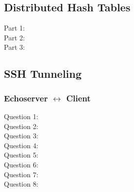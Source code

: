\subsection{Distributed Hash Tables}
\begin{description}
    \item[Part 1:] 
    \item[Part 2:] 
    \item[Part 3:] 
\end{description}

\subsection{SSH Tunneling}
\subsubsection{{\sc Echoserver} $\leftrightarrow$ {\sc Client}}
\begin{description}
    \item[Question 1:] 
    \item[Question 2:] 
    \item[Question 3:] 
    \item[Question 4:] 
    \item[Question 5:] 
    \item[Question 6:] 
    \item[Question 7:] 
    \item[Question 8:] 
\end{description}
